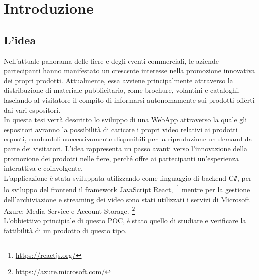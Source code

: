 \chapter{Introduzione}
\label{cap:introduzione}




\section{L'idea}

Nell'attuale panorama delle fiere e degli eventi commerciali, le aziende partecipanti hanno manifestato un crescente interesse nella promozione innovativa
dei propri prodotti. Attualmente, essa avviene principalmente attraverso la distribuzione di materiale pubblicitario, come brochure, volantini e cataloghi, 
lasciando al visitatore il compito di informarsi autonomamente sui prodotti offerti dai vari espositori.\\
In questa tesi verrà descritto lo sviluppo di una WebApp attraverso la quale gli espositori avranno la possibilità di caricare i propri video
relativi ai prodotti esposti, rendendoli successivamente disponibili per la riproduzione on-demand da parte dei visitatori.
L'idea rappresenta un passo avanti verso l'innovazione della promozione dei prodotti nelle fiere, perché offre ai partecipanti un'esperienza interattiva 
e coinvolgente. \\
L'applicazione è stata sviluppata utilizzando come linguaggio di backend C\texttt{\#}, per lo sviluppo del frontend il framework JavaScript React,~\footnote{\url{https://reactjs.org/}}  
mentre per la gestione dell'archiviazione e streaming dei video sono stati utilizzati i servizi di Microsoft Azure: Media Service e Account Storage.~\footnote{\url{https://azure.microsoft.com/}}\\
L'obbiettivo principiale di questo POC, è stato quello di studiare e verificare la fattibilità di un prodotto di questo tipo.\\

